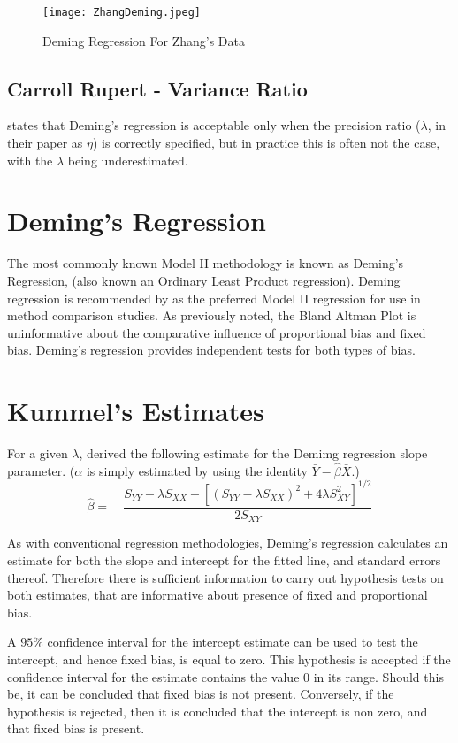 \documentclass[12pt, a4paper]{report}
\theoremstyle{plain}
\theoremstyle{definition}
\theoremstyle{remark}
\begin{document}
\begin{figure}[h!]
	\texttt{[image: ZhangDeming.jpeg]}
	\caption{Deming Regression For Zhang's Data}\label{ZhangDeming}
\end{figure}

\subsection{Carroll Rupert - Variance Ratio}
\citet{CarollRupert} states that Deming's
regression is acceptable only when the precision ratio ($\lambda$,
in their paper as $\eta$) is correctly specified, but in practice
this is often not the case, with the $\lambda$ being
underestimated.
\newpage


\section{Deming's Regression}
The most commonly known Model II methodology is known as Deming's
Regression, (also known an Ordinary Least Product regression).
Deming regression is recommended by \citet*{CornCoch} as the
preferred Model II regression for use in method comparison
studies. As previously noted, the Bland Altman Plot is
uninformative about the comparative influence of proportional bias
and fixed bias. Deming's regression provides independent tests for
both types of bias.

\section{Kummel's Estimates}
For a given $\lambda$, \citet{Kummel} derived the following
estimate for the Demimg regression slope parameter. ($\alpha$ is
simply estimated by using the identity
$\bar{Y}-\hat{\beta}\bar{X}$.)
\begin{equation}
\hat{\beta} =\quad \frac{S_{YY} - \lambda S_{XX}+[(S_{YY} -
	\lambda S_{XX})^{2}+ 4\lambda S^{2}_{XY}]^{1/2}}{2S_{XY}}
\end{equation}


As with conventional regression methodologies, Deming's regression
calculates an estimate for both the slope and intercept for the
fitted line, and standard errors thereof. Therefore there is
sufficient information to carry out hypothesis tests on both
estimates, that are informative about presence of fixed and
proportional bias.

A $95\%$ confidence interval for the intercept estimate can be used to test the intercept, and hence fixed bias, is equal to
zero. This hypothesis is accepted if the confidence interval for the estimate contains the value $0$ in its range. Should this be,
it can be concluded that fixed bias is not present. Conversely, if the hypothesis is rejected, then it is concluded that the
intercept is non zero, and that fixed bias is present.
\end{document}
